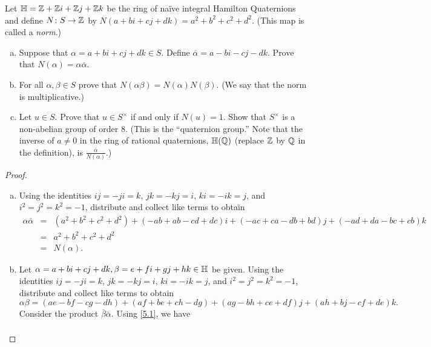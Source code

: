 \documentclass[10pt]{amsart}
\begin{document}
\begin{thm}
  Let $\mathbb{H} = \mathbb{Z} + \mathbb{Z} i + \mathbb{Z} j + \mathbb{Z} k$ be the ring of na\"{i}ve integral Hamilton Quaternions and define $N \colon S \rightarrow \mathbb{Z}$ by $N(a + bi + cj + dk) = a^2 + b^2 + c^2 + d^2$.
  (This map is called a {\it norm}.)
  \begin{enumerate}[(a)]
  \item
    Suppose that $\alpha = a + bi + cj + dk \in S$.
    Define $\overline{\alpha} = a - bi - cj - dk$.
    Prove that $N(\alpha) = \alpha \overline{\alpha}$.
  \item
    For all $\alpha, \beta \in S$ prove that $N(\alpha\beta) = N(\alpha)N(\beta)$.
    (We say that the norm is multiplicative.)
  \item
    Let $u \in S$.
    Prove that $u \in S^\times$ if and only if $N(u) = 1$.
    Show that $S^\times$ is a non-abelian group of order 8.
    (This is the ``quaternion group.''
    Note that the inverse of $a \neq 0$ in the ring of rational quaternions, $\mathbb{H}(\mathbb{Q})$ (replace $\mathbb{Z}$ by $\mathbb{Q}$ in the definition), is $\frac{\overline{\alpha}}{N(\alpha)}$.)
  \end{enumerate}
  \begin{proof}
    \begin{enumerate}[(a)]
    \item
      Using the identities $ij = -ji = k$, $jk = -kj = i$, $ki = -ik = j$, and $i^2 = j^2 = k^2 = -1$, distribute and collect like terms to obtain
      \begin{eqnarray*}
        \alpha\overline{\alpha} &=& (a^2 + b^2 + c^2 + d^2) + (-ab + ab - cd + dc)i + (-ac + ca -db + bd)j + (-ad + da -bc + cb)k\\
        &=& a^2 + b^2 + c^2 + d^2\\
        &=& N(\alpha).
      \end{eqnarray*}
      \item
        Let $\alpha = a + bi + cj + dk, \beta = e + fi + gj + hk \in \mathbb{H}$ be given.
        Using the identities $ij = -ji = k$, $jk = -kj = i$, $ki = -ik = j$, and $i^2 = j^2 = k^2 = -1$, distribute and collect like terms to obtain
        \begin{equation}\label{5.1}
          \alpha\beta = (ae - bf - cg -dh) + (af + be + ch -dg) + (ag - bh + ce + df)j + (ah + bj - cf + de)k.
        \end{equation}
        Consider the product $\overline{\beta}\overline{\alpha}$.
        Using \eqref{5.1}, we have 
        \begin{eqnarray*}

\end{eqnarray*}
\end{enumerate}
\end{proof}
\end{thm}
\end{document}
